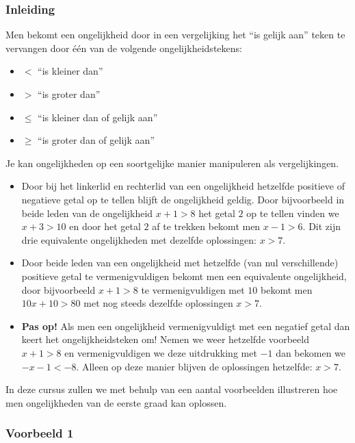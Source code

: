 \subsubsection{Inleiding}

Men bekomt een ongelijkheid door in een vergelijking het ``is gelijk aan'' teken te vervangen door \'{e}\'{e}n van de volgende ongelijkheidstekens:
\begin{itemize}
\item $ < $ ``is kleiner dan''
\item $ > $  ``is groter dan''
\item $ \leq $ ``is kleiner dan of gelijk aan''
\item $ \geq $ ``is groter dan of gelijk aan''
\end{itemize}

Je kan ongelijkheden op een soortgelijke manier manipuleren als vergelijkingen.
\begin{itemize}
\item Door bij het linkerlid en rechterlid van een ongelijkheid hetzelfde positieve of negatieve getal op te tellen blijft de ongelijkheid geldig. Door bijvoorbeeld in beide leden van de ongelijkheid $x+1>8$ het getal $2$ op te tellen vinden we $x+3>10$ en door het getal $2$ af te trekken bekomt men $x-1>6$. Dit zijn drie equivalente ongelijkheden met dezelfde oplossingen: $x>7$.
\item Door beide leden van een ongelijkheid met hetzelfde (van nul verschillende) positieve getal te vermenigvuldigen bekomt men een equivalente ongelijkheid, door bijvoorbeeld $x+1>8$ te vermenigvuldigen met $10$ bekomt men $10x+10>80$ met nog steeds dezelfde oplossingen $x>7$.
\item {\bf Pas op!} Als men een ongelijkheid vermenigvuldigt met een negatief getal dan keert het ongelijkheidsteken om! Nemen we weer hetzelfde voorbeeld $x+1>8$ en vermenigvuldigen we deze uitdrukking met $-1$ dan bekomen we $-x-1<-8$. Alleen op deze manier blijven de oplossingen hetzelfde: $x>7$.
\end{itemize}

In deze cursus zullen we met behulp van een aantal voorbeelden illustreren hoe men ongelijkheden van de eerste graad kan oplossen.\\

\subsubsection{Voorbeeld 1}

